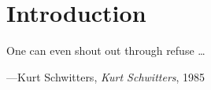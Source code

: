 \chapter{Introduction}






\epigraph{One can even shout out through refuse \ldots}{\hfill---Kurt Schwitters, \textit{Kurt Schwitters}, 1985}










